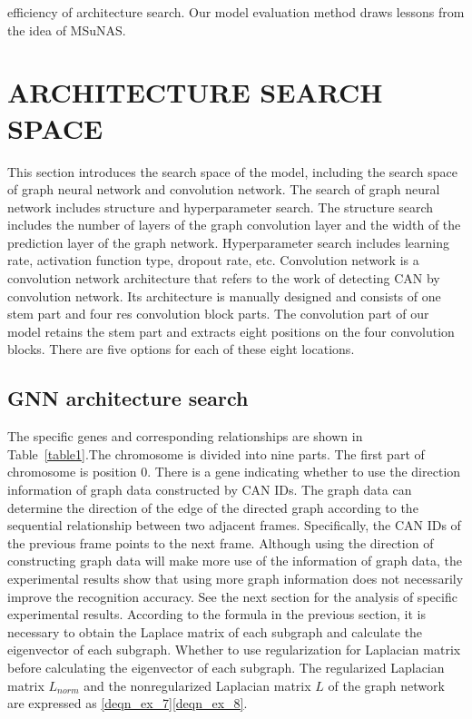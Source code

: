 \documentclass[lettersize,journal]{IEEEtran}
\begin{document}
efficiency of architecture search. Our model evaluation method draws lessons from the idea of MSuNAS.

\section{ARCHITECTURE SEARCH SPACE}\label{section_architecture_search_space}
This section introduces the search space of the model, including the search space of graph neural network and convolution network. The search of graph neural network includes structure and hyperparameter search. The structure search includes the number of layers of the graph convolution layer and the width of the prediction layer of the graph network. Hyperparameter search includes learning rate, activation function type, dropout rate, etc. Convolution network is a convolution network architecture \cite{48} that refers to the work of detecting CAN by convolution network. Its architecture is manually designed and consists of one stem part and four res convolution block parts. The convolution part of our model retains the stem part and extracts eight positions on the four convolution blocks. There are five options for each of these eight locations.

\subsection{GNN architecture search}
The specific genes and corresponding relationships are shown in Table~\ref{table1}.The chromosome is divided into nine parts. The first part of chromosome is position 0. There is a gene indicating whether to use the direction information of graph data constructed by CAN IDs. The graph data can determine the direction of the edge of the directed graph according to the sequential relationship between two adjacent frames. Specifically, the CAN IDs of the previous frame points to the next frame. Although using the direction of constructing graph data will make more use of the information of graph data, the experimental results show that using more graph information does not necessarily improve the recognition accuracy. See the next section for the analysis of specific experimental results. According to the formula in the previous section, it is necessary to obtain the Laplace matrix of each subgraph and calculate the eigenvector of each subgraph. Whether to use regularization for Laplacian matrix before calculating the eigenvector of each subgraph. The regularized Laplacian matrix $L_{norm}$ and the nonregularized Laplacian matrix $L$ of the graph network are expressed as \eqref{deqn_ex_7}\eqref{deqn_ex_8}. 
\end{document}
